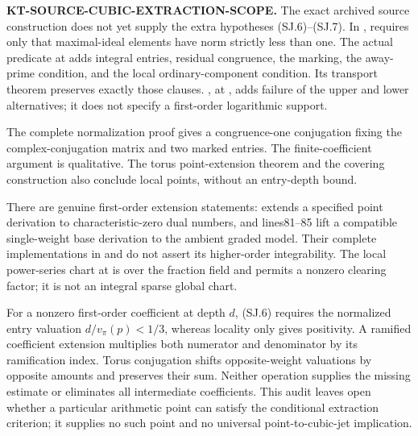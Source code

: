 \documentclass[11pt,a4paper]{article}
\theoremstyle{definition}
\renewcommand{\paragraph}[1]{\par\smallskip\noindent\textbf{#1}\quad\ignorespaces}
\begin{document}
\paragraph{KT-SOURCE-CUBIC-EXTRACTION-SCOPE.}
The exact archived source construction does not yet supply
the extra hypotheses (SJ.6)--(SJ.7).
In ,  requires
only that maximal-ideal elements have norm strictly less than
one.  The actual  predicate at
 adds integral entries, residual
congruence, the marking, the away-prime condition, and the
local ordinary-component condition.  Its transport theorem
 preserves exactly those clauses.
, at , adds failure
of the upper and lower alternatives; it does not specify a
first-order logarithmic support.

The complete normalization proof
 gives a congruence-one conjugation
fixing the complex-conjugation matrix and two marked entries.
The finite-coefficient argument
 is qualitative.
The torus point-extension theorem
and the covering construction 
also conclude local points, without an entry-depth bound.

There are genuine first-order extension statements:
 extends a specified point
derivation to characteristic-zero dual numbers, and
lines81--85 lift a compatible single-weight base derivation
to the ambient graded model.  Their complete implementations
in 
and 
do not assert its higher-order integrability.
The local power-series chart at 
is over the fraction field and permits a nonzero clearing
factor; it is not an integral sparse global chart.

For a nonzero first-order coefficient at depth $d$, (SJ.6)
requires the normalized entry valuation
$d/v_\pi(p)<1/3$, whereas locality only gives positivity.
A ramified coefficient extension multiplies both numerator
and denominator by its ramification index.  Torus conjugation
shifts opposite-weight valuations by opposite amounts and
preserves their sum.  Neither operation supplies the missing
estimate or eliminates all intermediate coefficients.
This audit leaves open whether a particular arithmetic point
can satisfy the conditional extraction criterion; it supplies
no such point and no universal point-to-cubic-jet implication.
\end{document}
